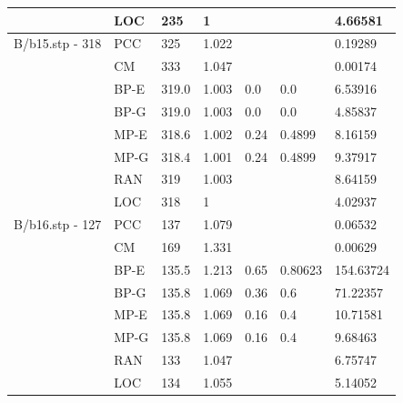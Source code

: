 \documentclass[12pt,a4paper]{article}
\begin{document}
\begin{center}
\begin{tabular}{l|l|l|l|l|l|l}
		&LOC&235&1&&&4.66581\\\hline
		B/b15.stp - 318&PCC&325&1.022&&&0.19289\\
		&CM&333&1.047&&&0.00174\\
		&BP-E&319.0&1.003&0.0&0.0&6.53916\\
		&BP-G&319.0&1.003&0.0&0.0&4.85837\\
		&MP-E&318.6&1.002&0.24&0.4899&8.16159\\
		&MP-G&318.4&1.001&0.24&0.4899&9.37917\\
		&RAN&319&1.003&&&8.64159\\
		&LOC&318&1&&&4.02937\\\hline
		B/b16.stp - 127&PCC&137&1.079&&&0.06532\\
		&CM&169&1.331&&&0.00629\\
		&BP-E&135.5&1.213&0.65&0.80623&154.63724\\
		&BP-G&135.8&1.069&0.36&0.6&71.22357\\
		&MP-E&135.8&1.069&0.16&0.4&10.71581\\
		&MP-G&135.8&1.069&0.16&0.4&9.68463\\
		&RAN&133&1.047&&&6.75747\\
		&LOC&134&1.055&&&5.14052\\\hline
	\end{tabular}
\end{center}
\end{document}
